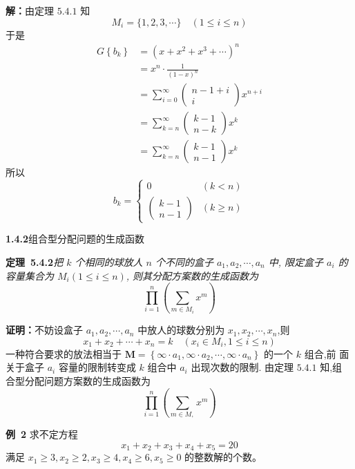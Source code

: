 \documentclass{report}
\begin{document}
\textbf{解：}由定理 $5.4.1$ 知
$$
M_{i}=\{1,2,3, \cdots\} \quad(1 \leqslant i \leqslant n)
$$
于是
$$
\begin{aligned}
G\left\{b_{k}\right\} &=\left(x+x^{2}+x^{3}+\cdots\right)^{n} \\
&=x^{n} \cdot \frac{1}{(1-x)^{n}} \\
&=\sum_{i=0}^{\infty}\left(\begin{array}{c}
n-1+i \\
i
\end{array}\right) x^{n+i} \\
&=\sum_{k=n}^{\infty}\left(\begin{array}{c}
k-1 \\
n-k
\end{array}\right) x^{k} \\
&=\sum_{k=n}^{\infty}\left(\begin{array}{l}
k-1 \\
n-1
\end{array}\right) x^{k}
\end{aligned}
$$
所以
$$
b_{k}=\left\{\begin{array}{ll}
0 & (k<n) \\
\left(\begin{array}{l}
k-1 \\
n-1
\end{array}\right) & (k \geqslant n)
\end{array}\right.
$$

\textbf{1.4.2}组合型分配问题的生成函数

\noindent
\textbf{定理\ 5.4.2}\textsl{把 $k$ 个相同的球放人 $n$ 个不同的盒子 $a_{1}, a_{2}, \cdots, a_{n}$ 中, 限定盒子 $a_{i}$ 的容量集合为 $M_{i}(1 \leqslant i \leqslant n)$, 则其分配方案数的生成函数为
$$
\prod_{i=1}^{n}\left(\sum_{m \in M_{i}} x^{m}\right)
$$}

\noindent
\textbf{证明：}不妨设盒子 $a_{1}, a_{2}, \cdots, a_{n}$ 中放人的球数分别为 $x_{1}, x_{2}, \cdots, x_{n}$,则
$$
x_{1}+x_{2}+\cdots+x_{n}=k \quad\left(x_{i} \in M_{i}, 1 \leqslant i \leqslant n\right)
$$
一种符合要求的放法相当于 $\boldsymbol{M}=\left\{\infty \cdot a_{1}, \infty \cdot a_{2}, \cdots, \infty \cdot a_{n}\right\}$ 的一个 $k$ 组合,前 面关于盒子 $a_{i}$ 容量的限制转变成 $k$ 组合中 $a_{i}$ 出现次数的限制. 由定理 $5.4 .1$ 知,组 合型分配问题方案数的生成函数为
$$
\prod_{i=1}^{n}\left(\sum_{m \in M,} x^{m}\right)
$$


\textbf{例\ 2} 求不定方程
$$
x_{1}+x_{2}+x_{3}+x_{4}+x_{5}=20
$$
满足
$x_{1} \geqslant 3, x_{2} \geqslant 2, x_{3} \geqslant 4, x_{4} \geqslant 6, x_{5} \geqslant 0$
的整数解的个数。
\end{document}
